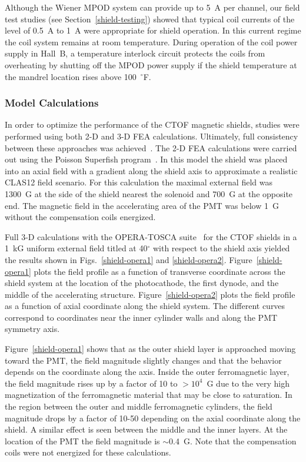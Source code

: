 \documentclass{elsart}
\begin{document}
Although the Wiener MPOD system can provide up to 5~A per channel, our field test studies
(see Section~\ref{shield-testing}) showed that typical coil currents of the level of 0.5~A
to 1~A were appropriate for shield operation. In this current regime the coil system remains
at room temperature. During operation of the coil power supply in Hall~B, a temperature
interlock circuit protects the coils from overheating by shutting off the MPOD power supply if
the shield temperature at the mandrel location rises above 100~$^{\circ}$F.

\subsubsection{Model Calculations}

In order to optimize the performance of the CTOF magnetic shields, studies were performed 
using both 2-D and 3-D FEA calculations. Ultimately, full consistency between these approaches
was achieved~\cite{cn2015-003}. The 2-D FEA calculations were carried out using the Poisson
Superfish program~\cite{poisson}. In this model the shield was placed into an axial field with a
gradient along the shield axis to approximate a realistic CLAS12 field scenario. For this calculation
the maximal external field was 1300~G at the side of the shield nearest the solenoid and 700~G
at the opposite end. The magnetic field in the accelerating area of the PMT was below 1~G without
the compensation coils energized. 

Full 3-D calculations with the OPERA-TOSCA suite~\cite{opera} for the CTOF shields in a 1~kG
uniform external field titled at 40$^\circ$ with respect to the shield axis yielded the results 
shown in Figs.~\ref{shield-opera1} and \ref{shield-opera2}. Figure~\ref{shield-opera1} plots the 
field profile as a function of transverse coordinate across the shield system at the location 
of the photocathode, the first dynode, and the middle of the accelerating structure. 
Figure~\ref{shield-opera2} plots the field profile as a function of axial coordinate along the 
shield system. The different curves correspond to coordinates near the inner cylinder 
walls and along the PMT symmetry axis.

Figure~\ref{shield-opera1} shows that as the outer shield layer is approached moving toward the
PMT, the field magnitude slightly changes and that the behavior depends on the coordinate along 
the axis. Inside the outer ferromagnetic layer, the field magnitude rises up by a factor of 
10 to $>10^4$~G due to the very high magnetization of the ferromagnetic material that may be 
close to saturation. In the region between the outer and middle ferromagnetic cylinders, the 
field magnitude drops by a factor of 10-50 depending on the axial coordinate along the shield. 
A similar effect is seen between the middle and the inner layers. At the location of the PMT 
the field magnitude is $\sim$0.4~G. Note that the compensation coils were not energized for 
these calculations. 
\end{document}
